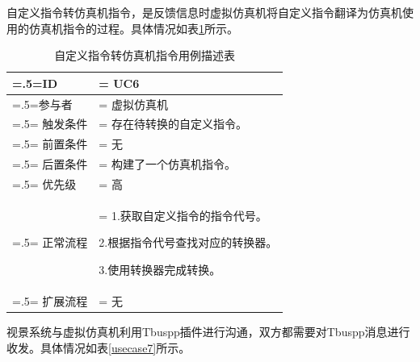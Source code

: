 \par
自定义指令转仿真机指令，是反馈信息时虚拟仿真机将自定义指令翻译为仿真机使用的仿真机指令的过程。具体情况如表\ref{usecase6}所示。
\begin{table}[htbp]
    \begin{center}
        \caption{自定义指令转仿真机指令用例描述表}
        \label{usecase6}
        \renewcommand\arraystretch{1.5}
        \begin{tabularx}{0.8\textwidth}{ 
            | >{\centering\arraybackslash\hsize=.5\hsize\linewidth=\hsize}X 
            | >{\raggedright\arraybackslash\hsize=1.5\hsize\linewidth=\hsize}X 
            | }
            \hline
            \textbf{ID} & \textbf{UC6}\\
            \hline
            参与者 & 虚拟仿真机\\
            \hline
            触发条件 &  存在待转换的自定义指令。\\
            \hline
            前置条件 & 无\\
            \hline
            后置条件 & 构建了一个仿真机指令。\\
            \hline
            优先级 & 高\\
            \hline
            正常流程 & 1.获取自定义指令的指令代号。\par 2.根据指令代号查找对应的转换器。\par 3.使用转换器完成转换。\\
            \hline
            扩展流程 & 无\\
            \hline
        \end{tabularx}
    \end{center}
\end{table}
\par
视景系统与虚拟仿真机利用Tbuspp插件进行沟通，双方都需要对Tbuspp消息进行收发。具体情况如表\ref{usecase7}所示。
